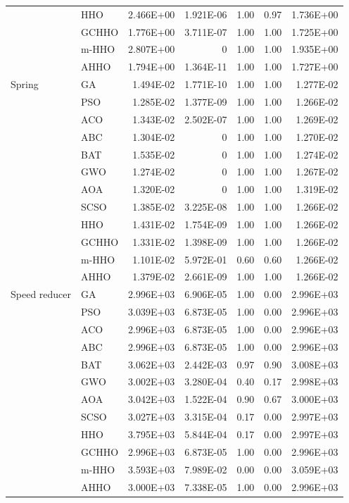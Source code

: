 \begin{longtable}{llrrrrr}
 & HHO & 2.466E+00 & 1.921E-06 & 1.00 & 0.97 & 1.736E+00 \\
 & GCHHO & 1.776E+00 & 3.711E-07 & 1.00 & 1.00 & 1.725E+00 \\
 & m-HHO & 2.807E+00 & 0 & 1.00 & 1.00 & 1.935E+00 \\
 & AHHO & 1.794E+00 & 1.364E-11 & 1.00 & 1.00 & 1.727E+00 \\
\addlinespace
Spring & GA & 1.494E-02 & 1.771E-10 & 1.00 & 1.00 & 1.277E-02 \\
 & PSO & 1.285E-02 & 1.377E-09 & 1.00 & 1.00 & 1.266E-02 \\
 & ACO & 1.343E-02 & 2.502E-07 & 1.00 & 1.00 & 1.269E-02 \\
 & ABC & 1.304E-02 & 0 & 1.00 & 1.00 & 1.270E-02 \\
 & BAT & 1.535E-02 & 0 & 1.00 & 1.00 & 1.274E-02 \\
 & GWO & 1.274E-02 & 0 & 1.00 & 1.00 & 1.267E-02 \\
 & AOA & 1.320E-02 & 0 & 1.00 & 1.00 & 1.319E-02 \\
 & SCSO & 1.385E-02 & 3.225E-08 & 1.00 & 1.00 & 1.266E-02 \\
 & HHO & 1.431E-02 & 1.754E-09 & 1.00 & 1.00 & 1.266E-02 \\
 & GCHHO & 1.331E-02 & 1.398E-09 & 1.00 & 1.00 & 1.266E-02 \\
 & m-HHO & 1.101E-02 & 5.972E-01 & 0.60 & 0.60 & 1.266E-02 \\
 & AHHO & 1.379E-02 & 2.661E-09 & 1.00 & 1.00 & 1.266E-02 \\
\addlinespace
Speed reducer & GA & 2.996E+03 & 6.906E-05 & 1.00 & 0.00 & 2.996E+03 \\
 & PSO & 3.039E+03 & 6.873E-05 & 1.00 & 0.00 & 2.996E+03 \\
 & ACO & 2.996E+03 & 6.873E-05 & 1.00 & 0.00 & 2.996E+03 \\
 & ABC & 2.996E+03 & 6.873E-05 & 1.00 & 0.00 & 2.996E+03 \\
 & BAT & 3.062E+03 & 2.442E-03 & 0.97 & 0.90 & 3.008E+03 \\
 & GWO & 3.002E+03 & 3.280E-04 & 0.40 & 0.17 & 2.998E+03 \\
 & AOA & 3.042E+03 & 1.522E-04 & 0.90 & 0.67 & 3.000E+03 \\
 & SCSO & 3.027E+03 & 3.315E-04 & 0.17 & 0.00 & 2.997E+03 \\
 & HHO & 3.795E+03 & 5.844E-04 & 0.17 & 0.00 & 2.997E+03 \\
 & GCHHO & 2.996E+03 & 6.873E-05 & 1.00 & 0.00 & 2.996E+03 \\
 & m-HHO & 3.593E+03 & 7.989E-02 & 0.00 & 0.00 & 3.059E+03 \\
 & AHHO & 3.000E+03 & 7.338E-05 & 1.00 & 0.00 & 2.996E+03 \\
\end{longtable}
